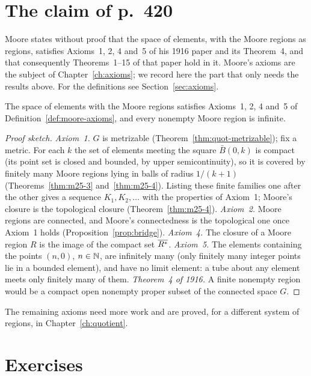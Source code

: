 \section{The claim of p.~420}\label{sec:p420}

Moore states without proof that the space of elements, with the Moore regions as regions, satisfies
Axioms~1, 2, 4 and~5 of his 1916 paper and its Theorem~4, and that consequently Theorems~1--15 of
that paper hold in it. Moore's axioms are the subject of Chapter~\ref{ch:axioms}; we record here the
part that only needs the results above. For the definitions see Section~\ref{sec:axioms}.

\begin{proposition}\label{prop:p420}
The space of elements with the Moore regions satisfies Axioms~1, 2, 4 and~5 of
Definition~\ref{def:moore-axioms}, and every nonempty Moore region is infinite.
\end{proposition}

\begin{proof}[Proof sketch]
\emph{Axiom~1.} $G$ is metrizable (Theorem~\ref{thm:quot-metrizable}); fix a metric. For each $k$ the
set of elements meeting the square $\bar B(0,k)$ is compact (its point set is closed and bounded, by
upper semicontinuity), so it is covered by finitely many Moore regions lying in balls of radius
$1/(k+1)$ (Theorems~\ref{thm:m25-3} and~\ref{thm:m25-4}). Listing these finite families one after the
other gives a sequence $K_1,K_2,\dots$ with the properties of Axiom~1; Moore's closure is the
topological closure (Theorem~\ref{thm:m25-4}).
\emph{Axiom~2.} Moore regions are connected, and Moore's connectedness is the topological one once
Axiom~1 holds (Proposition~\ref{prop:bridge}).
\emph{Axiom~4.} The closure of a Moore region $R$ is the image of the compact set $\overline{R^{\ast}}$.
\emph{Axiom~5.} The elements containing the points $(n,0)$, $n\in\mathbb{N}$, are infinitely many (only finitely
many integer points lie in a bounded element), and have no limit element: a tube about any element
meets only finitely many of them.
\emph{Theorem~4 of 1916.} A finite nonempty region would be a compact open nonempty proper subset of the
connected space $G$.
\end{proof}


The remaining axioms need more work and are proved, for a different system of regions, in
Chapter~\ref{ch:quotient}.

\section*{Exercises}


